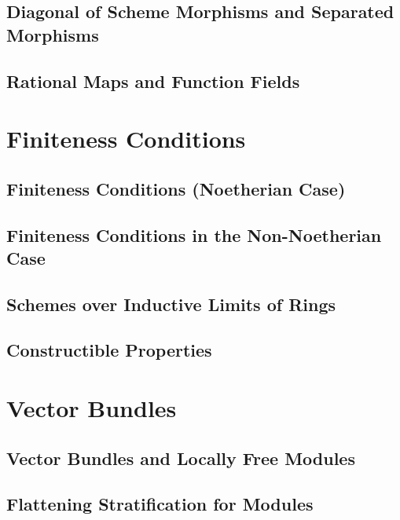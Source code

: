 \documentclass[11pt, a4paper]{article}
\begin{document}
\subsection{Diagonal of Scheme Morphisms and Separated Morphisms}

\subsection{Rational Maps and Function Fields}

\section{Finiteness Conditions}

\subsection{Finiteness Conditions (Noetherian Case)}

\subsection{Finiteness Conditions in the Non-Noetherian Case}

\subsection{Schemes over Inductive Limits of Rings}

\subsection{Constructible Properties}

\section{Vector Bundles}

\subsection{Vector Bundles and Locally Free Modules}

\subsection{Flattening Stratification for Modules}
\end{document}
